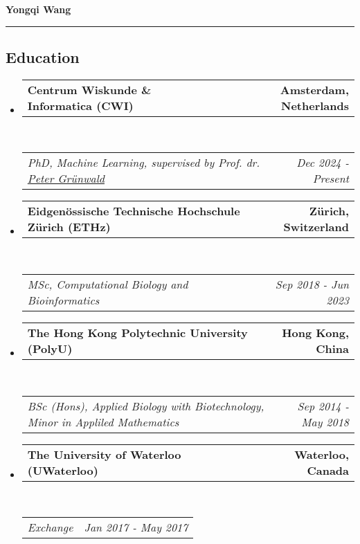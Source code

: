 \documentclass[10pt,a4paper]{article}
\makeatletter
\newcommand{\headerrow}[2]
{\begin{tabular*}{\linewidth}{l@{\extracolsep{\fill}}r}
	#1 &
	#2 \\
\end{tabular*}}
\makeatother
\begin{document}

\begin{center}
{\LARGE \textbf{Yongqi Wang}}

\end{center}



\hrule
\vspace{-1em}
\subsection*{Education}

\begin{itemize}
	\parskip=0.1em

	\item
	\headerrow
		{\textbf{Centrum Wiskunde \& Informatica (CWI)}}
		{\textbf{Amsterdam, Netherlands}}
	\\
	\headerrow
		{\emph{PhD, Machine Learning, supervised by Prof. dr. \href{https://safestatistics.com/}{Peter Gr\"{u}nwald}}}
		{\emph{Dec 2024 - Present}}

	\item
	\headerrow
		{\textbf{Eidgenössische Technische Hochschule Zürich (ETHz)}}
		{\textbf{Zürich, Switzerland}}
	\\
	\headerrow
		{\emph{MSc, Computational Biology and Bioinformatics}}
		{\emph{Sep 2018 - Jun 2023}}

	\item
	\headerrow
		{\textbf{The Hong Kong Polytechnic University (PolyU)}}
		{\textbf{Hong Kong, China}}
	\\
	\headerrow
		{\emph{BSc (Hons), Applied Biology with Biotechnology, Minor in Appliled Mathematics}}
		{\emph{Sep 2014 - May 2018}}

	\item
	\headerrow
		{\textbf{The University of Waterloo (UWaterloo)}}
		{\textbf{Waterloo, Canada}}
	\\
	\headerrow
		{\emph{Exchange}}
		{\emph{Jan 2017 - May 2017}}

\end{itemize}


\end{document}
